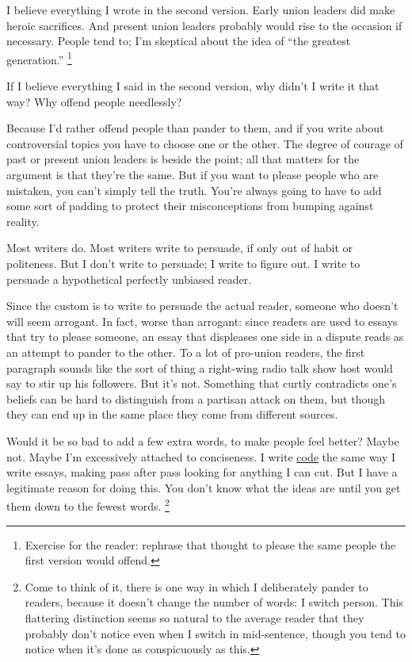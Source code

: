 \documentclass[12pt]{book}
\begin{document}
I believe everything I wrote in the second version. Early union leaders
did make heroic sacrifices. And present union leaders probably would
rise to the occasion if necessary. People tend to; I'm skeptical about
the idea of ``the greatest generation.'' \footnote{Exercise for the reader: rephrase that thought to please the
same people the first version would offend.}

If I believe everything I said in the second version, why didn't I write
it that way? Why offend people needlessly?

Because I'd rather offend people than pander to them, and if you write
about controversial topics you have to choose one or the other. The
degree of courage of past or present union leaders is beside the point;
all that matters for the argument is that they're the same. But if you
want to please people who are mistaken, you can't simply tell the truth.
You're always going to have to add some sort of padding to protect their
misconceptions from bumping against reality.

Most writers do. Most writers write to persuade, if only out of habit or
politeness. But I don't write to persuade; I write to figure out. I
write to persuade a hypothetical perfectly unbiased reader.

Since the custom is to write to persuade the actual reader, someone who
doesn't will seem arrogant. In fact, worse than arrogant: since readers
are used to essays that try to please someone, an essay that displeases
one side in a dispute reads as an attempt to pander to the other. To a
lot of pro-union readers, the first paragraph sounds like the sort of
thing a right-wing radio talk show host would say to stir up his
followers. But it's not. Something that curtly contradicts one's beliefs
can be hard to distinguish from a partisan attack on them, but though
they can end up in the same place they come from different sources.

Would it be so bad to add a few extra words, to make people feel better?
Maybe not. Maybe I'm excessively attached to conciseness. I write
\href{power.html}{code} the same way I write essays, making pass after
pass looking for anything I can cut. But I have a legitimate reason for
doing this. You don't know what the ideas are until you get them down to
the fewest words. \footnote{Come to think of it, there is one way in which I deliberately
pander to readers, because it doesn't change the number of words: I
switch person. This flattering distinction seems so natural to the
average reader that they probably don't notice even when I switch in
mid-sentence, though you tend to notice when it's done as conspicuously
as this.}
\end{document}
